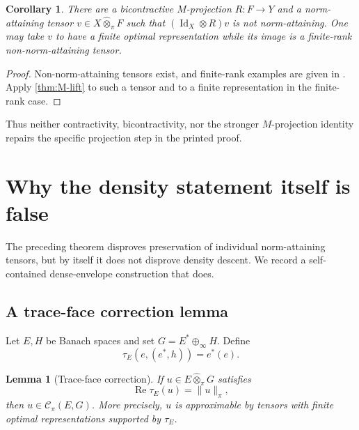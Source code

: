 \documentclass[11pt]{article}
\newtheorem{lemma}[theorem]{Lemma}
\newtheorem{corollary}[theorem]{Corollary}
\theoremstyle{definition}
\theoremstyle{remark}
\newcommand{\whot}{\widehat\otimes_\pi}
\newcommand{\Rea}{\operatorname{Re}}
\newcommand{\Id}{\operatorname{Id}}
\newcommand{\Cpi}{\mathscr C_\pi}
\begin{document}
\begin{corollary}\label{cor:M-destroys}
There are a bicontractive $M$-projection $R:F\to Y$ and a norm-attaining tensor $v\in X\whot F$ such that $(\Id_X\otimes R)v$ is not norm-attaining.  One may take $v$ to have a finite optimal representation while its image is a finite-rank non-norm-attaining tensor.
\end{corollary}

\begin{proof}
Non-norm-attaining tensors exist, and finite-rank examples are given in \cite[Proposition 5.5]{DantasEtAl2022}.  Apply \cref{thm:M-lift} to such a tensor and to a finite representation in the finite-rank case.
\end{proof}

Thus neither contractivity, bicontractivity, nor the stronger $M$-projection identity repairs the specific projection step in the printed proof.

\section{Why the density statement itself is false}

The preceding theorem disproves preservation of individual norm-attaining tensors, but by itself it does not disprove density descent.  We record a self-contained dense-envelope construction that does.

\subsection{A trace-face correction lemma}

Let $E,H$ be Banach spaces and set $G=E^*\oplus_\infty H$.  Define
\[
 \tau_E(e,(e^*,h))=e^*(e).
\]

\begin{lemma}[Trace-face correction]\label{lem:trace-face}
If $u\in E\whot G$ satisfies
\[
 \Rea\tau_E(u)=\|u\|_\pi,
\]
then $u\in\Cpi(E,G)$.  More precisely, $u$ is approximable by tensors with finite optimal representations supported by $\tau_E$.
\end{lemma}
\end{document}
